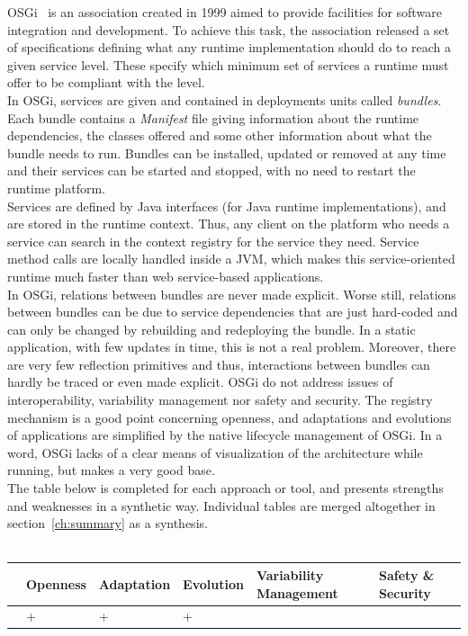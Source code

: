 OSGi~\cite{OSGI:r4} is an association created in 1999 aimed to provide facilities for software integration and development.
To achieve this task, the association released a set of specifications defining what any runtime implementation should do to reach a given service level. These specify which minimum set of services a runtime must offer to be compliant with the level.\\
In OSGi, services are given and contained in deployments units called {\it bundles}. Each bundle contains a {\it Manifest} file giving information about the runtime dependencies, the classes offered and some other information about what the bundle needs to run. Bundles can be installed, updated or removed at any time and their services can be started and stopped, with no need to restart the runtime platform.\\
Services are defined by Java interfaces (for Java runtime implementations), and are stored in the runtime context. Thus, any client on the platform who needs a service can search in the context registry for the service they need. Service method calls are locally handled inside a JVM, which makes this service-oriented runtime much faster than web service-based applications.\\

In OSGi, relations between bundles are never made explicit. Worse still, relations between bundles can be due to service dependencies that are just hard-coded and can only be changed by rebuilding and redeploying the bundle. In a static application, with few updates in time, this is not a real problem. Moreover, there are very few reflection primitives and thus, interactions between bundles can hardly be traced or even made explicit. OSGi do not address issues of interoperability, variability management nor safety and security. The registry mechanism is a good point concerning openness, and adaptations and evolutions of applications are simplified by the native lifecycle management of OSGi. In a word, OSGi lacks of a clear means of visualization of the architecture while running, but makes a very good base.\\

The table below is completed for each approach or tool, and presents strengths and weaknesses in a synthetic way. Individual tables are merged altogether in section~\ref{ch:summary} as a synthesis. \\
 \\
\begin{tabular}{ >{\centering}m{}| >{\centering}m{} >{\centering}m{}| >{\centering}m{} >{\centering}m{}| >{\centering\arraybackslash}m{}}
{\tiny Interoperability} & {\tiny Openness} & {\tiny Adaptation} & {\tiny Evolution} & {\tiny Variability Management} & {\tiny Safety \& Security}\\
 \hline
  & + & + & + &  & \\ 
  \hline
\end{tabular}\\


